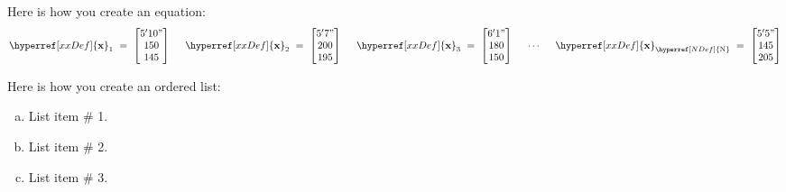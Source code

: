\documentclass{article}
\theoremstyle{definition}
\newcommand{\bs}[1]{\boldsymbol{#1}} %
\def \N{{\hyperref[NDef]{{\rm N}}}} %
\def \xx{{\hyperref[xxDef]{\bs{{\rm x}}}}} %
\begin{document}
Here is how you create an equation:
\begin{align*}
\xx_1 \ = \ \left[ \begin{matrix}
5'10" \\ 150 \\ 145
\end{matrix} \right]
%
\hspace{.5cm}
%
\xx_2 \ = \ \left[ \begin{matrix}
5'7" \\ 200 \\ 195
\end{matrix} \right]
%
\hspace{.5cm}
%
\xx_3 \ = \ \left[ \begin{matrix}
6'1" \\ 180 \\ 150
\end{matrix} \right]
%
\hspace{.5cm} \cdots \hspace{.5cm}
%
\xx_\N \ = \ \left[ \begin{matrix}
5'5" \\ 145 \\ 205
\end{matrix} \right]
\end{align*}

Here is how you create an ordered list:
\begin{enumerate}[(a)]
\item
List item \# 1.
\item
List item \# 2.
\item
List item \# 3.
\end{enumerate}
\end{document}
